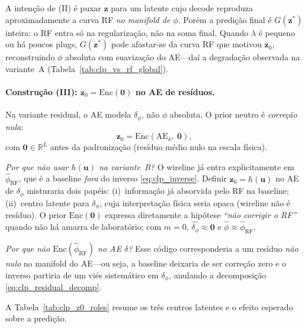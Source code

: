 \documentclass[11pt,a4paper]{article}
\newcommand{\deltaphi}{\ensuremath{\delta_{\phi}}}
\newcommand{\zvec}{\ensuremath{\mathbf{z}}}
\newcommand{\zzero}{\ensuremath{\mathbf{z}_0}}
\begin{document}
A intenção de (II) é puxar $\zvec$ para um latente cujo decode reproduza
aproximadamente a curva RF \emph{no manifold de $\phi$}.
Porém a predição final é $G(\zvec^{\ast})$ inteira: o RF entra só na
regularização, não na soma final.
Quando $\lambda$ é pequeno ou há poucos plugs, $G(\zvec^{\ast})$ pode
afastar-se da curva RF que motivou $\zzero$, reconstruindo $\phi$ absoluta
com suavização do AE---daí a degradação observada na variante~A
(Tabela~\ref{tab:clp_vs_rf_global}).

\paragraph{Construção (III): $\zzero=\mathrm{Enc}(\mathbf{0})$ no AE de
resíduos.}
Na variante residual, o AE modela $\deltaphi$, não $\phi$ absoluta.
O prior neutro é \emph{correção nula}:
\begin{equation}
  \zzero
  =
  \mathrm{Enc}\!\left(
    \mathrm{AE}_{\delta},\;
    \mathbf{0}
  \right),
  \label{eq:clp_enc_zero}
\end{equation}
com $\mathbf{0}\in\mathbb{R}^L$ antes da padronização (resíduo médio
nulo na escala física).

\emph{Por que não usar $h(\mathbf{u})$ na variante~B?}
O wireline já entra explicitamente em $\widehat{\phi}_{\mathrm{RF}}$,
que é a baseline \emph{fora} do inverso \eqref{eq:clp_inverse}.
Definir $\zzero=h(\mathbf{u})$ no AE de $\deltaphi$ misturaria dois papéis:
(i)~informação já absorvida pelo RF na baseline; (ii)~centro latente para
$\deltaphi$, cuja interpretação física seria opaca (wireline não é
resíduo).
O prior $\mathrm{Enc}(\mathbf{0})$ expressa diretamente a hipótese
\emph{``não corrigir o RF''} quando não há amarra de laboratório; com
$m=0$, $\widehat{\deltaphi}\approx\mathbf{0}$ e
$\widehat{\phi}\approx\widehat{\phi}_{\mathrm{RF}}$.

\emph{Por que não $\mathrm{Enc}(\widehat{\phi}_{\mathrm{RF}})$ no AE
$\delta$?}
Esse código corresponderia a um resíduo \emph{não nulo} no manifold do
AE---ou seja, a baseline deixaria de ser correção zero e o inverso
partiria de um viés sistemático em $\deltaphi$, anulando a decomposição
\eqref{eq:clp_residual_decomp}.

A Tabela~\ref{tab:clp_z0_roles} resume os três centros latentes e o
efeito esperado sobre a predição.
\end{document}
